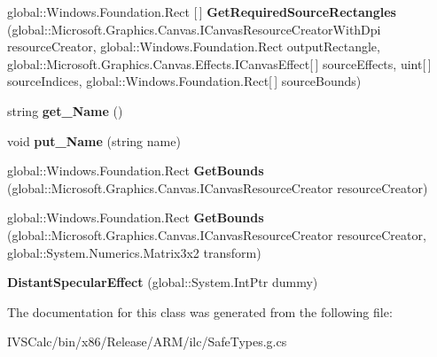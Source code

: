 \begin{DoxyCompactItemize}
\item 
\mbox{\label{class_microsoft_1_1_graphics_1_1_canvas_1_1_effects_1_1_distant_specular_effect_a93a1879da6359b3bf2aa38ddf33a2771}} 
global\+::\+Windows.\+Foundation.\+Rect \mbox{[}$\,$\mbox{]} {\bfseries Get\+Required\+Source\+Rectangles} (global\+::\+Microsoft.\+Graphics.\+Canvas.\+I\+Canvas\+Resource\+Creator\+With\+Dpi resource\+Creator, global\+::\+Windows.\+Foundation.\+Rect output\+Rectangle, global\+::\+Microsoft.\+Graphics.\+Canvas.\+Effects.\+I\+Canvas\+Effect\mbox{[}$\,$\mbox{]} source\+Effects, uint\mbox{[}$\,$\mbox{]} source\+Indices, global\+::\+Windows.\+Foundation.\+Rect\mbox{[}$\,$\mbox{]} source\+Bounds)
\item 
\mbox{\label{class_microsoft_1_1_graphics_1_1_canvas_1_1_effects_1_1_distant_specular_effect_a82e8aaa30963376f6b07df9e21242c69}} 
string {\bfseries get\+\_\+\+Name} ()
\item 
\mbox{\label{class_microsoft_1_1_graphics_1_1_canvas_1_1_effects_1_1_distant_specular_effect_a28aa135298de7a35d3863337b9b75fdf}} 
void {\bfseries put\+\_\+\+Name} (string name)
\item 
\mbox{\label{class_microsoft_1_1_graphics_1_1_canvas_1_1_effects_1_1_distant_specular_effect_a9b4792ba0a0d27c7fa752d4020ded41a}} 
global\+::\+Windows.\+Foundation.\+Rect {\bfseries Get\+Bounds} (global\+::\+Microsoft.\+Graphics.\+Canvas.\+I\+Canvas\+Resource\+Creator resource\+Creator)
\item 
\mbox{\label{class_microsoft_1_1_graphics_1_1_canvas_1_1_effects_1_1_distant_specular_effect_a1767db5f8057f907e45b60d25f75e9dc}} 
global\+::\+Windows.\+Foundation.\+Rect {\bfseries Get\+Bounds} (global\+::\+Microsoft.\+Graphics.\+Canvas.\+I\+Canvas\+Resource\+Creator resource\+Creator, global\+::\+System.\+Numerics.\+Matrix3x2 transform)
\item 
\mbox{\label{class_microsoft_1_1_graphics_1_1_canvas_1_1_effects_1_1_distant_specular_effect_aa2fbc147e71a970a34acd9561a293e56}} 
{\bfseries Distant\+Specular\+Effect} (global\+::\+System.\+Int\+Ptr dummy)
\end{DoxyCompactItemize}


The documentation for this class was generated from the following file\+:\begin{DoxyCompactItemize}
\item 
I\+V\+S\+Calc/bin/x86/\+Release/\+A\+R\+M/ilc/Safe\+Types.\+g.\+cs\end{DoxyCompactItemize}
